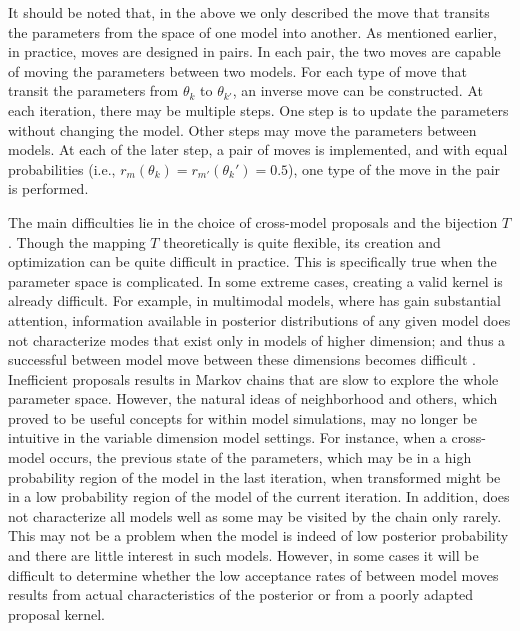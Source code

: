 
It should be noted that, in the above we only described the move that
transits the parameters from the space of one model into another. As
mentioned earlier, in practice, \rjmcmc moves are designed in pairs. In each
pair, the two moves are capable of moving the parameters between two models.
For each type of move that transit the parameters from $\theta_k$ to
$\theta_{k'}$, an inverse move can be constructed. At each iteration, there
may be multiple steps. One step is to update the parameters without changing
the model. Other steps may move the parameters between models. At each of the
later step, a pair of moves is implemented, and with equal probabilities
(i.e., $r_m(\theta_k) = r_{m'}(\theta_k') = 0.5$), one type of the move in
the pair is performed.

The main difficulties lie in the choice of cross-model proposals and the
bijection $T$. Though the mapping $T$ theoretically is quite flexible, its
creation and optimization can be quite difficult in practice. This is
specifically true when the parameter space is complicated. In some extreme
cases, creating a valid kernel is already difficult. For example, in
multimodal models, where \rjmcmc has gain substantial attention, information
available in posterior distributions of any given model does not characterize
modes that exist only in models of higher dimension; and thus a successful
between model move between these dimensions becomes difficult
\cite{Jasra:2007id}. Inefficient proposals results in Markov chains that are
slow to explore the whole parameter space. However, the natural ideas of
neighborhood and others, which proved to be useful concepts for within model
simulations, may no longer be intuitive in the variable dimension model
settings. For instance, when a cross-model occurs, the previous state of the
parameters, which may be in a high probability region of the model in the
last iteration, when transformed might be in a low probability region of the
model of the current iteration. In addition, \rjmcmc does not characterize
all models well as some may be visited by the chain only rarely. This may not
be a problem when the model is indeed of low posterior probability and there
are little interest in such models. However, in some cases it will be
difficult to determine whether the low acceptance rates of between model
moves results from actual characteristics of the posterior or from a poorly
adapted proposal kernel.

